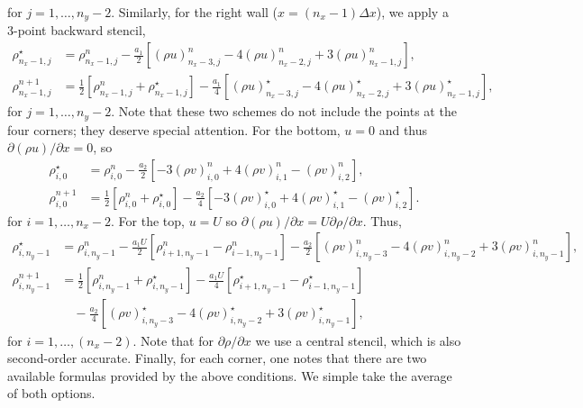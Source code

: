 \documentclass[11pt]{article}
\newcommand{\ind}[4]{{#1}^{#2}_{#3,#4}}
\begin{document}
for $j = 1,\hdots,n_y-2$. Similarly, for the right wall ($x = (n_x-1)\Delta x$), we apply a 3-point backward stencil,
\begin{align}
\ind{\rho}{\star}{n_x-1}{j} &= \ind{\rho}{n}{n_x-1}{j} 
- \frac{a_1}{2}\left[\ind{(\rho u)}{n}{n_x-3}{j} - 4\ind{(\rho u)}{n}{n_x-2}{j} + 3\ind{(\rho u)}{n}{n_x-1}{j}\right],\\
\ind{\rho}{n+1}{n_x-1}{j} &= \frac{1}{2}\left[ \ind{\rho}{n}{n_x-1}{j} + \ind{\rho}{\star}{n_x-1}{j} \right] 
- \frac{a_1}{4}\left[\ind{(\rho u)}{\star}{n_x-3}{j} - 4\ind{(\rho u)}{\star}{n_x-2}{j} + 3\ind{(\rho u)}{\star}{n_x-1}{j}\right],
\end{align}
for $j = 1,\hdots,n_y-2$. Note that these two schemes do not include the points at the four corners; they deserve special attention. For the bottom, $u = 0$ and thus $\partial(\rho u)/\partial x = 0$, so
\begin{align}
\ind{\rho}{\star}{i}{0} &= \ind{\rho}{n}{i}{0} - \frac{a_2}{2}\left[ -3\ind{(\rho v)}{n}{i}{0} + 4\ind{(\rho v)}{n}{i}{1} - \ind{(\rho v)}{n}{i}{2} \right],\\
\ind{\rho}{n+1}{i}{0} &= \frac{1}{2}\left[\ind{\rho}{n}{i}{0} + \ind{\rho}{\star}{i}{0}\right] - \frac{a_2}{4}\left[ -3\ind{(\rho v)}{\star}{i}{0} + 4\ind{(\rho v)}{\star}{i}{1} - \ind{(\rho v)}{\star}{i}{2} \right].
\end{align}
for $i = 1,\hdots,n_x-2$. For the top, $u = U$ so $\partial(\rho u)/\partial x = U\partial \rho/\partial x$. Thus,
\begin{align}
\ind{\rho}{\star}{i}{n_y-1} &= \ind{\rho}{n}{i}{n_y-1} - \frac{a_1 U}{2}\left[\ind{\rho}{n}{i+1}{n_y-1} - \ind{\rho}{n}{i-1}{n_y-1}\right] - \frac{a_2}{2}\left[ \ind{(\rho v)}{n}{i}{n_y - 3} - 4\ind{(\rho v)}{n}{i}{n_y - 2} + 3\ind{(\rho v)}{n}{i}{n_y-1} \right],\\
\ind{\rho}{n+1}{i}{n_y-1} &= \frac{1}{2}\left[\ind{\rho}{n}{i}{n_y-1} + \ind{\rho}{\star}{i}{n_y-1} \right] - \frac{a_1 U}{4}\left[\ind{\rho}{\star}{i+1}{n_y-1} - \ind{\rho}{\star}{i-1}{n_y-1}\right]\\
&\quad- \frac{a_2}{4}\left[ \ind{(\rho v)}{\star}{i}{n_y - 3} - 4\ind{(\rho v)}{\star}{i}{n_y - 2} + 3\ind{(\rho v)}{\star}{i}{n_y-1} \right],
\end{align}
for $i = 1,\hdots,(n_x-2)$. Note that for $\partial\rho/\partial x$ we use a central stencil, which is also second-order accurate. Finally, for each corner, one notes that there are two available formulas provided by the above conditions.
We simple take the average of both options.
\end{document}
